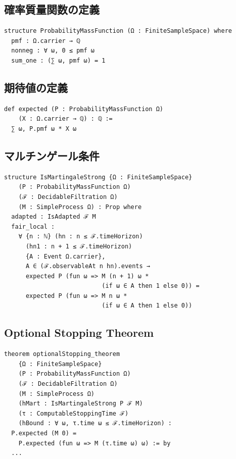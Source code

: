 \documentclass[a4paper,12pt]{ltjsarticle}
\theoremstyle{definition}
\begin{document}
\subsection{確率質量関数の定義}

\begin{verbatim}
structure ProbabilityMassFunction (Ω : FiniteSampleSpace) where
  pmf : Ω.carrier → ℚ
  nonneg : ∀ ω, 0 ≤ pmf ω
  sum_one : (∑ ω, pmf ω) = 1
\end{verbatim}

\subsection{期待値の定義}

\begin{verbatim}
def expected (P : ProbabilityMassFunction Ω)
    (X : Ω.carrier → ℚ) : ℚ :=
  ∑ ω, P.pmf ω * X ω
\end{verbatim}

\subsection{マルチンゲール条件}

\begin{verbatim}
structure IsMartingaleStrong {Ω : FiniteSampleSpace}
    (P : ProbabilityMassFunction Ω)
    (ℱ : DecidableFiltration Ω)
    (M : SimpleProcess Ω) : Prop where
  adapted : IsAdapted ℱ M
  fair_local :
    ∀ {n : ℕ} (hn : n ≤ ℱ.timeHorizon)
      (hn1 : n + 1 ≤ ℱ.timeHorizon)
      {A : Event Ω.carrier},
      A ∈ (ℱ.observableAt n hn).events →
      expected P (fun ω => M (n + 1) ω *
                           (if ω ∈ A then 1 else 0)) =
      expected P (fun ω => M n ω *
                           (if ω ∈ A then 1 else 0))
\end{verbatim}

\subsection{Optional Stopping Theorem}

\begin{verbatim}
theorem optionalStopping_theorem
    {Ω : FiniteSampleSpace}
    (P : ProbabilityMassFunction Ω)
    (ℱ : DecidableFiltration Ω)
    (M : SimpleProcess Ω)
    (hMart : IsMartingaleStrong P ℱ M)
    (τ : ComputableStoppingTime ℱ)
    (hBound : ∀ ω, τ.time ω ≤ ℱ.timeHorizon) :
  P.expected (M 0) =
    P.expected (fun ω => M (τ.time ω) ω) := by
  ...
\end{verbatim}
\end{document}
